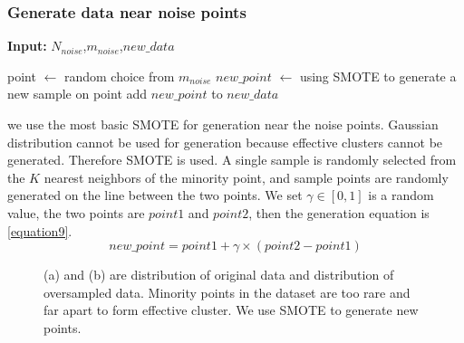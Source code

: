 \documentclass[runningheads]{llncs}
\begin{document}
\subsubsection{Generate data near noise points}
\begin{algorithm}[tb]
  \caption{$generate\_noise$}
  \label{alg5}
  \hspace*{0.02in} {\bf Input:} $N_{noise}$,$m_{noise}$,$new\_data$
  \begin{algorithmic}
    \State point $\leftarrow$ random choice from $m_{noise}$
    \State $new\_point$ $\leftarrow$ using SMOTE to generate a new sample on point
    \State add $new\_point$ to $new\_data$
    \EndFor
  \end{algorithmic}
\end{algorithm}
we use the most basic SMOTE for generation near the noise points.
Gaussian distribution cannot be used for generation because effective clusters cannot be generated. 
Therefore SMOTE is used.
A single sample is randomly selected from the $K$ nearest neighbors of the minority point, 
 and sample points are randomly generated on the line between the two points.
 We set $\gamma \in [0,1]$ is a random value, the two points are $point1$ and $point2$,
 then the generation equation is \ref{equation9}.
 \begin{equation}
  \label{equation9}
  new\_point=point1+\gamma \times (point2-point1)
\end{equation}

\begin{figure}[tb]
  \centering
  \quad
  \caption{(a) and (b) are distribution of original data and distribution of oversampled data.
  Minority points in the dataset are too rare and far apart to form effective cluster. 
  We use SMOTE to generate new points.}
  \label{fig14}
  \end{figure}
\end{document}
